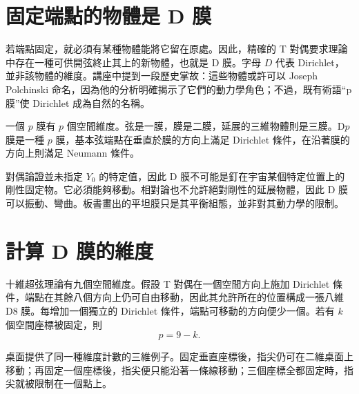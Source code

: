 \section{固定端點的物體是 D 膜}

若端點固定，就必須有某種物體能將它留在原處。因此，精確的 T 對偶要求理論中存在一種可供開弦終止其上的新物體，也就是 D 膜。字母 \(D\) 代表 Dirichlet，並非該物體的維度。講座中提到一段歷史掌故：這些物體或許可以 Joseph Polchinski 命名，因為他的分析明確揭示了它們的動力學角色；不過，既有術語``p 膜''使 Dirichlet 成為自然的名稱。

一個 \(p\) 膜有 \(p\) 個空間維度。弦是一膜，膜是二膜，延展的三維物體則是三膜。D\(p\) 膜是一種 \(p\) 膜，基本弦端點在垂直於膜的方向上滿足 Dirichlet 條件，在沿著膜的方向上則滿足 Neumann 條件。

對偶論證並未指定 \(Y_0\) 的特定值，因此 D 膜不可能是釘在宇宙某個特定位置上的剛性固定物。它必須能夠移動。相對論也不允許絕對剛性的延展物體，因此 D 膜可以振動、彎曲。板書畫出的平坦膜只是其平衡組態，並非對其動力學的限制。

\begin{classroomqa}
\end{classroomqa}

\section{計算 D 膜的維度}

十維超弦理論有九個空間維度。假設 T 對偶在一個空間方向上施加 Dirichlet 條件，端點在其餘八個方向上仍可自由移動，因此其允許所在的位置構成一張八維 D8 膜。每增加一個獨立的 Dirichlet 條件，端點可移動的方向便少一個。若有 \(k\) 個空間座標被固定，則
\begin{equation}
  p=9-k.
  \label{eq:l10-dp-counting}
\end{equation}

桌面提供了同一種維度計數的三維例子。固定垂直座標後，指尖仍可在二維桌面上移動；再固定一個座標後，指尖便只能沿著一條線移動；三個座標全都固定時，指尖就被限制在一個點上。

